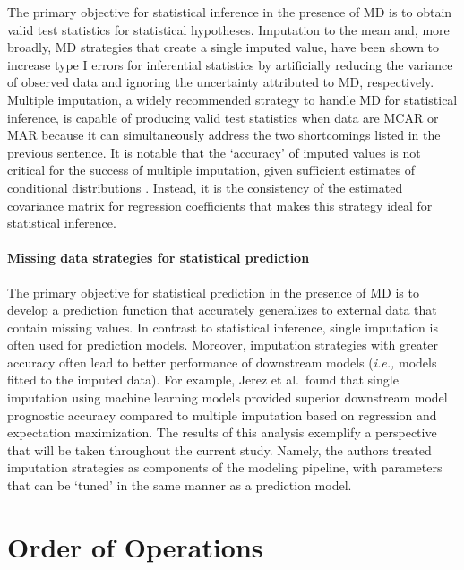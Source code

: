 \documentclass[AMA,STIX1COL,doublespace]{WileyNJD-v2}
\begin{document}
The primary objective for statistical inference in the presence of MD is
to obtain valid test statistics for statistical hypotheses. Imputation
to the mean and, more broadly, MD strategies that create a single
imputed value, have been shown to increase type I errors for inferential
statistics by artificially reducing the variance of observed data and
ignoring the uncertainty attributed to MD, respectively. Multiple
imputation, a widely recommended strategy to handle MD for statistical
inference, is capable of producing valid test statistics when data are
MCAR or MAR because it can simultaneously address the two shortcomings
listed in the previous sentence. It is notable that the `accuracy' of
imputed values is not critical for the success of multiple imputation,
given sufficient estimates of conditional distributions
\citep{van2018flexible}. Instead, it is the consistency of the estimated
covariance matrix for regression coefficients that makes this strategy
ideal for statistical inference.

\paragraph{Missing data strategies for statistical prediction}

The primary objective for statistical prediction in the presence of MD
is to develop a prediction function that accurately generalizes to
external data that contain missing values. In contrast to statistical
inference, single imputation is often used for prediction models.
Moreover, imputation strategies with greater accuracy often lead to
better performance of downstream models (\textit{i.e., }models fitted to
the imputed data). For example, Jerez et al.~found that single
imputation using machine learning models provided superior downstream
model prognostic accuracy compared to multiple imputation based on
regression and expectation maximization.\citep{jerez2010missing} The
results of this analysis exemplify a perspective that will be taken
throughout the current study. Namely, the authors treated imputation
strategies as components of the modeling pipeline, with parameters that
can be `tuned' in the same manner as a prediction model.

\section{Order of Operations} \label{sec:oop}
\end{document}
